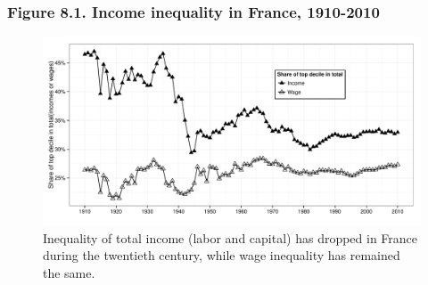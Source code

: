 \documentclass[t]{beamer}\usepackage[]{graphicx}\usepackage[]{color}
\newenvironment{knitrout}{}{} %
\begin{document}
\begin{frame}[label=Figure_8_1,fragile]
\frametitle{Figure 8.1. Income inequality in France, 1910-2010}
\begin{figure}[t]
\begin{minipage}[b]{\textwidth}
\centering
\begin{knitrout}\footnotesize
{}\color{fgcolor}

{\centering \includegraphics[width=1\linewidth]{figures/bw/Figure_8_1} 

}



\end{knitrout}
\caption{Inequality of total income (labor and capital) has dropped in France during the twentieth century, while wage inequality has remained the same.}
\end{minipage}
\end{figure}
\end{frame}
\end{document}
